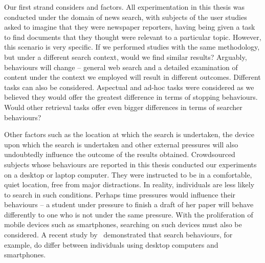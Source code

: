 \begin{figure}[h!]
    \centering
\end{figure}

Our first strand considers  and  factors. All experimentation in this thesis was conducted under the domain of news search, with subjects of the user studies asked to imagine that they were newspaper reporters, having being given a task to find documents that they thought were relevant to a particular topic. However, this scenario is very specific. If we performed studies with the same methodology, but under a different search context, would we find similar results? Arguably, behaviours will change -- general web search and a detailed examination of content under the context we employed will result in different outcomes. Different tasks can also be considered. Aspectual and ad-hoc tasks were considered as we believed they would offer the greatest difference in terms of stopping behaviours. Would other retrieval tasks offer even bigger differences in terms of searcher behaviours?

Other factors such as the location at which the search is undertaken, the device upon which the search is undertaken and other external pressures will also undoubtedly influence the outcome of the results obtained. Crowdsourced subjects whose behaviours are reported in this thesis conducted our experiments on a desktop or laptop computer. They were instructed to be in a comfortable, quiet location, free from major distractions. In reality, individuals are less likely to search in such conditions. Perhaps time pressures would influence their behaviours -- a student under pressure to finish a draft of her paper will behave differently to one who is not under the same pressure. With the proliferation of mobile devices such as smartphones, searching on such devices must also be considered. A recent study by~\cite{ong2017scent_behaviour} demonstrated that search behaviours, for example, do differ between individuals using desktop computers and smartphones.


